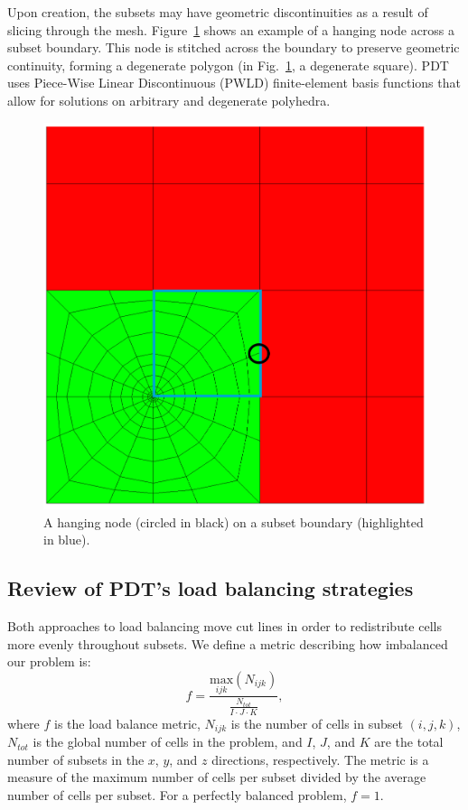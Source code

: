 \documentclass[times,final]{elsarticle}
\begin{document}
Upon creation, the subsets may have geometric discontinuities as a result of slicing through the mesh.
Figure~\ref{hanging_node} shows an example of a hanging node across a subset boundary.
This node is stitched across the boundary to preserve geometric continuity, forming a degenerate polygon \cite{degenerate} (in Fig.~\ref{hanging_node}, a degenerate square).
PDT uses Piece-Wise Linear Discontinuous (PWLD) finite-element basis functions \cite{pwld_ragusa,pwld_teresa} that allow for solutions on arbitrary and degenerate polyhedra.
\begin{figure}[H]
  \centering
  \includegraphics[scale=0.15,trim=0cm 0cm 8cm 8cm,clip]{../figures/hanging_node_spiderweb_example.png}
   \caption{A hanging node (circled in black) on a subset boundary (highlighted in blue).}
   \label{hanging_node}
\end{figure}

\subsection{Review of PDT's load balancing strategies}

Both approaches to load balancing move cut lines in order to redistribute cells more evenly throughout subsets. We define a metric describing how imbalanced our problem is:
\begin{equation}
f =\frac{\underset{ijk}{\text{max}}(N_{ijk})}{\frac{N_{tot}}{I\cdot J\cdot K}},
\label{metric_def}
\end{equation}
where $f$ is the load balance metric, $N_{ijk}$ is the number of cells in subset $(i,j,k)$, $N_{tot}$ is the global number of cells in the problem, and $I$, $J$, and $K$ are the total number of subsets in the $x$, $y$, and $z$ directions, respectively. The metric is a measure of the maximum number of cells per subset divided by the average number of cells per subset. For a perfectly balanced problem, $f = 1$.
\end{document}
